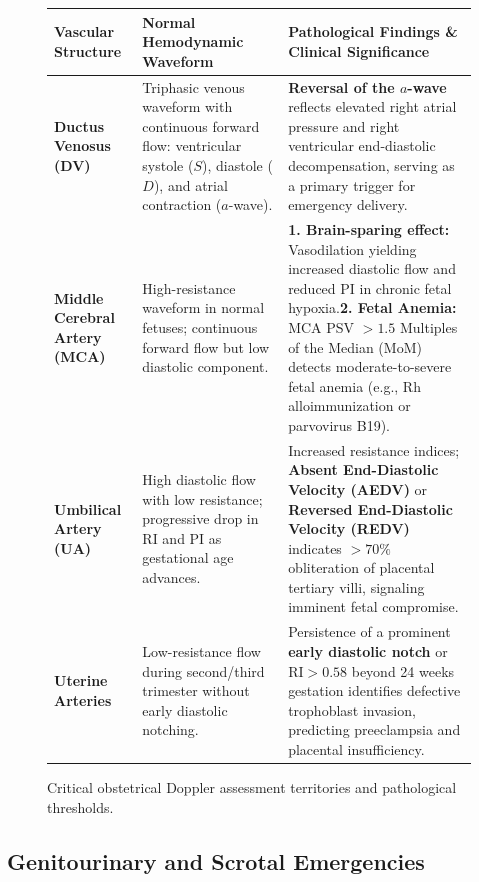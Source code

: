 \documentclass[11pt,a4paper]{article}
\begin{document}
\begin{figure}[htbp]
\centering
\begin{tabular}{p{3.5cm}p{5.5cm}p{5.5cm}}
\toprule
\textbf{Vascular Structure} & \textbf{Normal Hemodynamic Waveform} & \textbf{Pathological Findings \& Clinical Significance} \\
\midrule
\textbf{Ductus Venosus (DV)} & Triphasic venous waveform with continuous forward flow: ventricular systole ($S$), diastole ($D$), and atrial contraction ($a$-wave). & \textbf{Reversal of the $a$-wave} reflects elevated right atrial pressure and right ventricular end-diastolic decompensation, serving as a primary trigger for emergency delivery. \\
\addlinespace
\textbf{Middle Cerebral Artery (MCA)} & High-resistance waveform in normal fetuses; continuous forward flow but low diastolic component. & \textbf{1. Brain-sparing effect:} Vasodilation yielding increased diastolic flow and reduced PI in chronic fetal hypoxia.\newline\textbf{2. Fetal Anemia:} MCA PSV $> 1.5$ Multiples of the Median (MoM) detects moderate-to-severe fetal anemia (e.g., Rh alloimmunization or parvovirus B19). \\
\addlinespace
\textbf{Umbilical Artery (UA)} & High diastolic flow with low resistance; progressive drop in RI and PI as gestational age advances. & Increased resistance indices; \textbf{Absent End-Diastolic Velocity (AEDV)} or \textbf{Reversed End-Diastolic Velocity (REDV)} indicates $> 70\%$ obliteration of placental tertiary villi, signaling imminent fetal compromise. \\
\addlinespace
\textbf{Uterine Arteries} & Low-resistance flow during second/third trimester without early diastolic notching. & Persistence of a prominent \textbf{early diastolic notch} or $\text{RI} > 0.58$ beyond 24 weeks gestation identifies defective trophoblast invasion, predicting preeclampsia and placental insufficiency. \\
\bottomrule
\end{tabular}
\caption{Critical obstetrical Doppler assessment territories and pathological thresholds.}
\label{tab:ob_doppler}
\end{figure}

\subsection{Genitourinary and Scrotal Emergencies}
\end{document}
